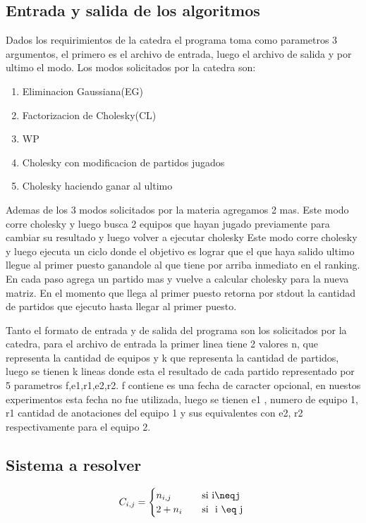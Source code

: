 \subsection{Entrada y salida de los algoritmos}

Dados los requirimientos de la catedra el programa toma como parametros 3 argumentos, el primero es el archivo de entrada, luego el archivo de salida y
por ultimo el modo. Los modos solicitados por la catedra son:
\begin{enumerate}
    \item Eliminacion Gaussiana(EG)
\item Factorizacion de Cholesky(CL)
    \item WP
    \item Cholesky con modificacion de partidos jugados
    \item Cholesky haciendo ganar al ultimo
    \end{enumerate}
    Ademas de los 3 modos solicitados por la materia agregamos 2 mas.
    Este modo corre cholesky y luego busca 2 equipos que hayan jugado previamente para cambiar su resultado y luego volver a ejecutar cholesky
    Este modo corre cholesky y luego ejecuta un ciclo donde el objetivo es lograr que el que haya salido ultimo llegue al primer puesto ganandole
    al que tiene por arriba inmediato en el ranking. En cada paso agrega un partido mas y vuelve a calcular cholesky para la nueva matriz.
    En el momento que llega al primer puesto retorna por stdout la cantidad de partidos que ejecuto hasta llegar al primer puesto.

    Tanto el formato de entrada y de salida del programa son los solicitados por la catedra, para el archivo de entrada la primer linea tiene 2 valores n,
    que representa la cantidad de equipos  y k que representa la cantidad de partidos,
    luego se tienen k lineas donde esta el resultado de cada partido representado por 5 parametros f,e1,r1,e2,r2.
    f contiene es una fecha de caracter opcional, en nuestos experimentos esta fecha no fue utilizada, luego se tienen e1 , numero de equipo 1,
    r1 cantidad de anotaciones del equipo 1 y sus equivalentes con e2, r2 respectivamente para el equipo 2.


\subsection{Sistema a resolver}

    \[ C_{i,j} =
    \begin{cases}
        n_{i,j}       & \quad \text{si }  \text{i\neqj}\\
        2+n_i & \quad \text{si } \text{ i \eq j }\\
    \end{cases}
    \]

